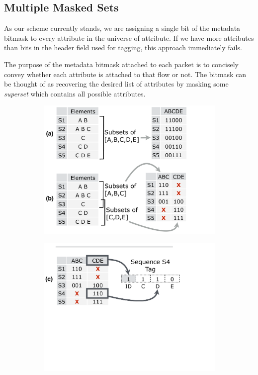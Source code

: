 \subsection{Multiple Masked Sets}

 As our scheme currently stands, we are assigning a single bit of the metadata bitmask to every
attribute in the universe of attribute. If we have more attributes than bits in the header field used for tagging, this approach immediately fails.

The purpose of the metadata bitmask attached to each packet is to concisely convey whether each attribute is attached to that flow or not. The bitmask can be thought of as recovering the desired list of attributes by masking some \textit{superset} which contains all possible attributes. 

\begin{figure}[t!] 
\begin{minipage}{1\linewidth}
\begin{subfigure}[b]{0.96\linewidth}
\includegraphics[trim={0 0 5.5cm 0}, clip, width=\linewidth]{figures/masking}
\end{subfigure} 
\begin{subfigure}[c]{0.96\linewidth}
\includegraphics[trim={0 13cm 5.5cm 0}, clip, width=\linewidth]{figures/making_metadata}

\end{subfigure}
\end{minipage}
\end{figure}
